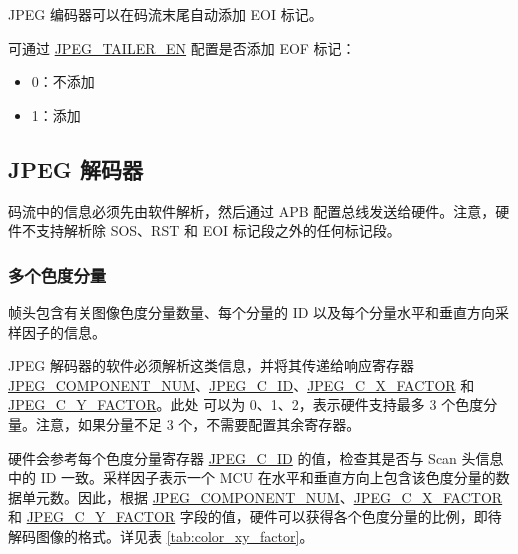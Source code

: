 \documentclass[main\_\_CN.tex]{subfiles}
\begin{document}
JPEG 编码器可以在码流末尾自动添加 EOI 标记。

可通过 \hyperref[fielddesc:JPEGTAILEREN]{JPEG\_TAILER\_EN} 配置是否添加 EOF 标记：
\begin{itemize}
    \item 0：不添加
    \item 1：添加
\end{itemize}

\subsection{JPEG 解码器}
\label{sec:jpegcodec-dec-mode}

码流中的信息必须先由软件解析，然后通过 APB 配置总线发送给硬件。注意，硬件不支持解析除 SOS、RST 和 EOI 标记段之外的任何标记段。

\subsubsection{多个色度分量}
\label{sec:jpegcodec-dec-color_components}

帧头包含有关图像色度分量数量、每个分量的 ID 以及每个分量水平和垂直方向采样因子的信息。

JPEG 解码器的软件必须解析这类信息，并将其传递给响应寄存器 \hyperref[fielddesc:JPEGCOMPONENTNUM]{JPEG\_COMPONENT\_NUM}、\hyperref[regdesc:JPEGC0REG]{JPEG\_C\_ID}、\hyperref[fielddesc:JPEGC0xFACTOR]{JPEG\_C\_X\_FACTOR} 和 \hyperref[fielddesc:JPEGC0YFACTOR]{JPEG\_C\_Y\_FACTOR}。此处  可以为 0、1、2，表示硬件支持最多 3 个色度分量。注意，如果分量不足 3 个，不需要配置其余寄存器。

硬件会参考每个色度分量寄存器 \hyperref[regdesc:JPEGC0REG]{JPEG\_C\_ID} 的值，检查其是否与 Scan 头信息中的 ID 一致。采样因子表示一个 MCU 在水平和垂直方向上包含该色度分量的数据单元数。因此，根据 \hyperref[fielddesc:JPEGCOMPONENTNUM]{JPEG\_COMPONENT\_NUM}、\hyperref[fielddesc:JPEGC0xFACTOR]{JPEG\_C\_X\_FACTOR} 和 \hyperref[fielddesc:JPEGC0YFACTOR]{JPEG\_C\_Y\_FACTOR} 字段的值，硬件可以获得各个色度分量的比例，即待解码图像的格式。详见表 \ref{tab:color_xy_factor}。
\end{document}
